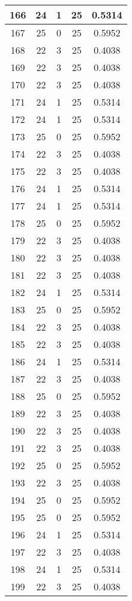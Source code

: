 \documentclass[letterpaper, 12pt]{article}
\begin{document}
\begin{longtable}{|c|c|c|c|c|}
\hline
166 & 24 & 1 & 25 & 0.5314 \\
\hline
167 & 25 & 0 & 25 & 0.5952 \\
\hline
168 & 22 & 3 & 25 & 0.4038 \\
\hline
169 & 22 & 3 & 25 & 0.4038 \\
\hline
170 & 22 & 3 & 25 & 0.4038 \\
\hline
171 & 24 & 1 & 25 & 0.5314 \\
\hline
172 & 24 & 1 & 25 & 0.5314 \\
\hline
173 & 25 & 0 & 25 & 0.5952 \\
\hline
174 & 22 & 3 & 25 & 0.4038 \\
\hline
175 & 22 & 3 & 25 & 0.4038 \\
\hline
176 & 24 & 1 & 25 & 0.5314 \\
\hline
177 & 24 & 1 & 25 & 0.5314 \\
\hline
178 & 25 & 0 & 25 & 0.5952 \\
\hline
179 & 22 & 3 & 25 & 0.4038 \\
\hline
180 & 22 & 3 & 25 & 0.4038 \\
\hline
181 & 22 & 3 & 25 & 0.4038 \\
\hline
182 & 24 & 1 & 25 & 0.5314 \\
\hline
183 & 25 & 0 & 25 & 0.5952 \\
\hline
184 & 22 & 3 & 25 & 0.4038 \\
\hline
185 & 22 & 3 & 25 & 0.4038 \\
\hline
186 & 24 & 1 & 25 & 0.5314 \\
\hline
187 & 22 & 3 & 25 & 0.4038 \\
\hline
188 & 25 & 0 & 25 & 0.5952 \\
\hline
189 & 22 & 3 & 25 & 0.4038 \\
\hline
190 & 22 & 3 & 25 & 0.4038 \\
\hline
191 & 22 & 3 & 25 & 0.4038 \\
\hline
192 & 25 & 0 & 25 & 0.5952 \\
\hline
193 & 22 & 3 & 25 & 0.4038 \\
\hline
194 & 25 & 0 & 25 & 0.5952 \\
\hline
195 & 25 & 0 & 25 & 0.5952 \\
\hline
196 & 24 & 1 & 25 & 0.5314 \\
\hline
197 & 22 & 3 & 25 & 0.4038 \\
\hline
198 & 24 & 1 & 25 & 0.5314 \\
\hline
199 & 22 & 3 & 25 & 0.4038 \\
\hline
\end{longtable}
\end{document}

